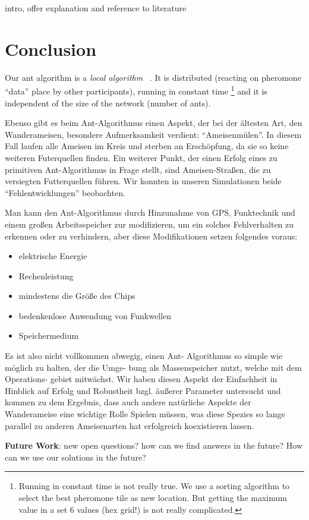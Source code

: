 intro, offer explanation and reference to literature

\section{Conclusion}\label{conclusion}

Our ant algorithm is a \emph{local algorithm} ~\cite{suomela2013}. It is
distributed (reacting on pheromone ``data'' place by other
participants), running in constant time \footnote{Running in constant
  time is not really true. We use a sorting algorithm to select the best
  pheromone tile as new location. But getting the maximum value in a set
  6 values (hex grid!) is not really complicated.} and it is independent
of the size of the network (number of ants).

Ebenso gibt es beim Ant-Algorithmus einen Aspekt, der bei der ältesten
Art, den Wanderameisen, besondere Aufmerksamkeit verdient:
``Ameisenmülen''. In diesem Fall laufen alle Ameisen im Kreis und
sterben an Erschöpfung, da sie so keine weiteren Futerquellen finden.
Ein weiterer Punkt, der einen Erfolg eines zu primitiven Ant-Algorithmus
in Frage stellt, sind Ameisen-Straßen, die zu versiegten Futterquellen
führen. Wir konnten in unseren Simulationen beide ``Fehlentwicklungen''
beobachten.

Man kann den Ant-Algorithmus durch Hinzunahme von GPS, Funktechnik und
einem großen Arbeitsspeicher zur modifizieren, um ein solches
Fehlverhalten zu erkennen oder zu verhindern, aber diese Modifikationen
setzen folgendes voraus:

\begin{itemize}
\tightlist
\item
  elektrische Energie
\item
  Rechenleistung
\item
  mindestens die Größe des Chips
\item
  bedenkenlose Anwendung von Funkwellen
\item
  Speichermedium
\end{itemize}

Es ist also nicht vollkommen abwegig, einen Ant- Algorithmus so simple
wie möglich zu halten, der die Umge- bung als Massenspeicher nutzt,
welche mit dem Operations- gebiet mitwächst. Wir haben diesen Aspekt der
Einfachheit in Hinblick auf Erfolg und Robustheit bzgl. äußerer
Parameter untersucht und kommen zu dem Ergebnis, dass auch andere
natürliche Aspekte der Wanderameise eine wichtige Rolle Spielen müssen,
was diese Spezies so lange parallel zu anderen Ameisenarten hat
erfolgreich koexistieren lassen.

\textbf{Future Work}: new open questions? how can we find answers in the
future? How can we use our solutions in the future?
